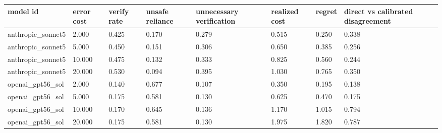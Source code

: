 \begin{tabular}{llllllll}
\toprule
model id & error cost & verify rate & unsafe reliance & unnecessary verification & realized cost & regret & direct vs calibrated disagreement \\
\midrule
anthropic\_sonnet5 & 2.000 & 0.425 & 0.170 & 0.279 & 0.515 & 0.250 & 0.338 \\
anthropic\_sonnet5 & 5.000 & 0.450 & 0.151 & 0.306 & 0.650 & 0.385 & 0.256 \\
anthropic\_sonnet5 & 10.000 & 0.475 & 0.132 & 0.333 & 0.825 & 0.560 & 0.244 \\
anthropic\_sonnet5 & 20.000 & 0.530 & 0.094 & 0.395 & 1.030 & 0.765 & 0.350 \\
openai\_gpt56\_sol & 2.000 & 0.140 & 0.677 & 0.107 & 0.350 & 0.195 & 0.138 \\
openai\_gpt56\_sol & 5.000 & 0.175 & 0.581 & 0.130 & 0.625 & 0.470 & 0.175 \\
openai\_gpt56\_sol & 10.000 & 0.170 & 0.645 & 0.136 & 1.170 & 1.015 & 0.794 \\
openai\_gpt56\_sol & 20.000 & 0.175 & 0.581 & 0.130 & 1.975 & 1.820 & 0.787 \\
\bottomrule
\end{tabular}

